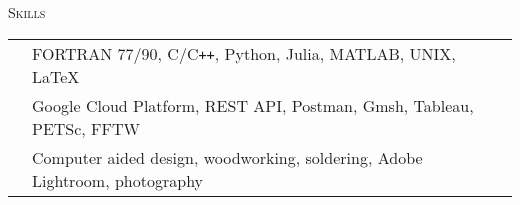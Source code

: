 \documentclass[10pt]{article}
\begin{document}
%
%
%
\begin{multicols}{2}
\textsc{Skills}
\columnbreak

\begin {table}[H]
\begin{tabular}{l l }
\hspace{-0.6em}{Programming} & \hspace{-0.5em} FORTRAN 77/90, C/C\texttt{++}, Python, Julia, MATLAB, UNIX, \LaTeX{}\\
\hspace{-0.6em}{Technologies} & \hspace{-0.5em} Google Cloud Platform, REST API, Postman, Gmsh, Tableau, PETSc, FFTW\\
\hspace{-0.6em}{Design     } & \hspace{-0.5em} Computer aided design, woodworking, soldering, Adobe Lightroom, photography\\
\end{tabular}	
\end{table}

\end{multicols}
\vspace{-1.5em}
%
\end{document}
